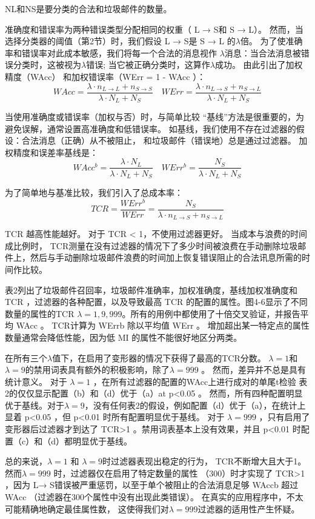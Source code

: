 \documentclass[UTF8]{ctexart}
\begin{document}
NL和NS是要分类的合法和垃圾邮件的数量。

准确度和错误率为两种错误类型分配相同的权重（ L → S和  S → L）。 然而，当选择分类器的阈值（第2节）时，我们假设  L → S是 S → L 的$\lambda$倍。 为了使准确率和错误率对此成本敏感，我们将每一个合法的消息视作 $\lambda$消息：当合法消息被错误分类时，这被视为$\lambda$错误; 当它被正确分类时，这算作$ \lambda$成功。 由此引出了加权精度（WAcc） 和加权错误率（WErr = 1 - WAcc ）：$$W A c c=\frac{\lambda \cdot n_{L \rightarrow L}+n_{S \rightarrow S}}{\lambda \cdot N_{L}+N_{S}} \quad W E r r=\frac{\lambda \cdot n_{L \rightarrow S}+n_{S \rightarrow L}}{\lambda \cdot N_{L}+N_{S}}$$

当使用准确度或错误率（加权与否）时，与简单比较 “基线”方法是很重要的，为避免误解，通常设置高准确度和低错误率。 如基线，我们使用不存在过滤器的假设：合法消息（正确）从不被阻止， 和垃圾邮件（错误地）总是通过过滤器。 加权精度和误差率基线是：$$WAcc^{b}=\frac{\lambda \cdot N_{L}}{\lambda \cdot N_{L}+N_{S}} \quad W E r r^{b}=\frac{N_{S}}{\lambda \cdot N_{L}+N_{S}}$$

为了简单地与基准比较，我们引入了总成本率：$$TCR=\frac{W E r r^{b}}{W E r r}=\frac{N_{S}}{\lambda \cdot n_{L \rightarrow S}+n_{S \rightarrow L}}$$

TCR 越高性能越好。 对于 TCR < 1，不使用过滤器更好。 当成本与浪费的时间成比例时， TCR测量在没有过滤器的情况下了多少时间被浪费在手动删除垃圾邮件上，然后与手动删除垃圾邮件浪费的时间加上恢复错误阻止的合法讯息所需的时间作比较。

表2列出了垃圾邮件召回率，垃圾邮件准确率，加权准确度，基线加权准确度和 TCR ，过滤器的各种配置，以及导致最高 TCR 的配置的属性。图4-6显示了不同数量的属性的TCR  $\lambda=1,9,999$。所有的用例中都使用了十倍交叉验证，并报告平均 WAcc 。 TCR计算为  WErrb 除以平均值 WErr 。 增加超出某一特定点的属性数量通常会降低性能，因为低 MI 的属性不能很好地区分两类。

在所有三个$ \lambda$值下，在启用了变形器的情况下获得了最高的TCR分数。 $\lambda=1$和$\lambda=9$的禁用词表具有额外的积极影响，除了$\lambda=999$ 。 然而，差异并不总是具有统计意义。 对于 $\lambda=1$ ，在所有过滤器的配置的WAcc上进行成对的单尾t检验 表2的仅仅显示配置（b）和（d）优于（a）at  p<0.05 。 然而，所有四种配置明显优于基线。对于$\lambda=9$，没有任何表2的假设，例如配置（d）优于（a），在统计上显着  p<0.05 ，但 p<0.01 时所有配置明显优于基线。 对于 $\lambda=999$ ，只有启用了变形器后过滤器才到达了 TCR>1 。禁用词表基本上没有效果，并且 p<0.01 时配置（c）和（d）都明显优于基线。 

总的来说，$\lambda=1$ 和 $\lambda=9$时过滤器表现出稳定的行为， TCR不断增大且大于1。然而$ \lambda=999$ 时，过滤器仅在启用了特定数量的属性 （300）时才实现了 TCR>1 ，因为 L→ S错误被严重惩罚，以至于单个被阻止的合法消息足够  WAccb 超过 WAcc （过滤器在300个属性中没有出现此类错误）。 在真实的应用程序中，不太可能精确地确定最佳属性数， 这使得我们对$\lambda=999$过滤器的适用性产生怀疑。
\end{document}
